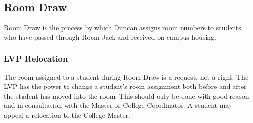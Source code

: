 \documentclass[USletter,12pt]{article}
\begin{document}
\begin{enumerate}[(a)]
\subsection{Room Draw}

Room Draw is the process by which Duncan assigns room numbers to students who have passed through Room Jack and received on campus housing.

\subsubsection{LVP Relocation}
The room assigned to a student during Room Draw is a request, not a right.  The LVP has the power to change a student's room assignment both before and after the student has moved into the room.  This should only be done with good reason and in consultation with the Master or College Coordinator.  A student may appeal a relocation to the College Master.


\end{enumerate}
\end{document}
